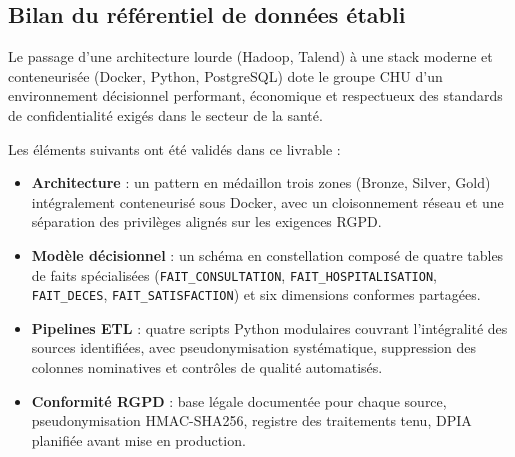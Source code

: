 \documentclass[12pt, a4paper]{report}
\begin{document}
\begin{itemize}[label=\textcolor{chuBlue}{\textbullet}]
\section{Bilan du référentiel de données établi}

Le passage d'une architecture lourde (Hadoop, Talend) à une stack moderne et conteneurisée (Docker, Python, PostgreSQL) dote le groupe CHU d'un environnement décisionnel performant, économique et respectueux des standards de confidentialité exigés dans le secteur de la santé.

Les éléments suivants ont été validés dans ce livrable :

\begin{itemize}[label=\textcolor{chuBlue}{\textbullet}]
  \item \textbf{Architecture} : un pattern en médaillon trois zones (Bronze, Silver, Gold) intégralement conteneurisé sous Docker, avec un cloisonnement réseau et une séparation des privilèges alignés sur les exigences RGPD.
  \item \textbf{Modèle décisionnel} : un schéma en constellation composé de quatre tables de faits spécialisées (\texttt{FAIT\_CONSULTATION}, \texttt{FAIT\_HOSPITALISATION}, \texttt{FAIT\_DECES}, \texttt{FAIT\_SATISFACTION}) et six dimensions conformes partagées.
  \item \textbf{Pipelines ETL} : quatre scripts Python modulaires couvrant l'intégralité des sources identifiées, avec pseudonymisation systématique, suppression des colonnes nominatives et contrôles de qualité automatisés.
  \item \textbf{Conformité RGPD} : base légale documentée pour chaque source, pseudonymisation HMAC-SHA256, registre des traitements tenu, DPIA planifiée avant mise en production.
\end{itemize}


\end{itemize}
\end{document}
